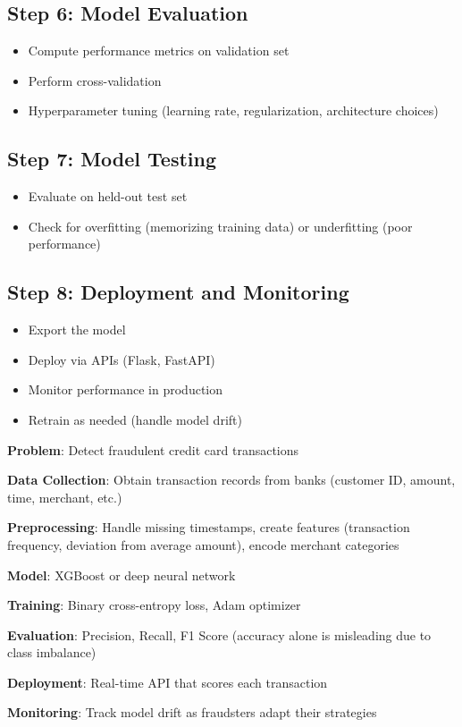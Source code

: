 \subsection{Step 6: Model Evaluation}

\begin{itemize}
    \item Compute performance metrics on validation set
    \item Perform cross-validation
    \item Hyperparameter tuning (learning rate, regularization, architecture choices)
\end{itemize}

\subsection{Step 7: Model Testing}

\begin{itemize}
    \item Evaluate on held-out test set
    \item Check for overfitting (memorizing training data) or underfitting (poor performance)
\end{itemize}

\subsection{Step 8: Deployment and Monitoring}

\begin{itemize}
    \item Export the model
    \item Deploy via APIs (Flask, FastAPI)
    \item Monitor performance in production
    \item Retrain as needed (handle model drift)
\end{itemize}

\begin{examplebox}
\textbf{Problem}: Detect fraudulent credit card transactions

\textbf{Data Collection}: Obtain transaction records from banks (customer ID, amount, time, merchant, etc.)

\textbf{Preprocessing}: Handle missing timestamps, create features (transaction frequency, deviation from average amount), encode merchant categories

\textbf{Model}: XGBoost or deep neural network

\textbf{Training}: Binary cross-entropy loss, Adam optimizer

\textbf{Evaluation}: Precision, Recall, F1 Score (accuracy alone is misleading due to class imbalance)

\textbf{Deployment}: Real-time API that scores each transaction

\textbf{Monitoring}: Track model drift as fraudsters adapt their strategies
\end{examplebox}

